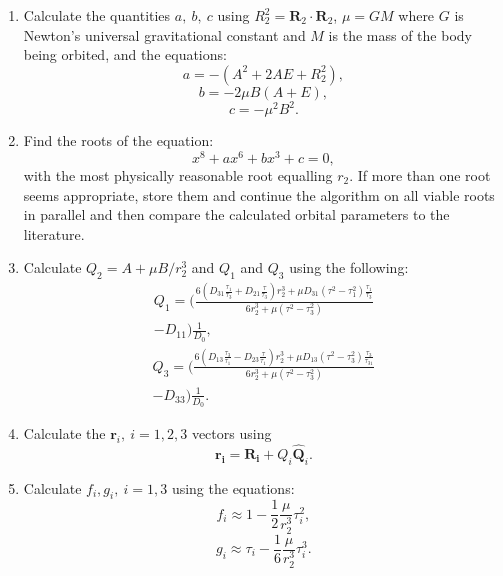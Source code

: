 \documentclass[10pt, twocolumn]{revtex4}    %
\begin{document}
\begin{enumerate}
 \item Calculate the quantities $a,\ b,\ c$ using $R_2^2 = \mathbf{R}_2 \cdot \mathbf{R}_2$, $\mu=GM$ where $G$ is Newton's universal gravitational constant and $M$ is the mass of the body being orbited, and the equations:
 \begin{equation}
 a = -(A^2 + 2AE + R_2^2),
 \end{equation}
 \begin{equation}
 b = -2\mu B(A+E),
 \end{equation}
 \begin{equation}
 c = -\mu^2B^2.
 \end{equation}
 \item Find the roots of the equation:
 \begin{equation}
 x^8 + ax^6 +bx^3 +c = 0,
 \end{equation}
 with the most physically reasonable root equalling $r_2$. If more than one root seems appropriate, store them and continue the algorithm on all viable roots in parallel and then compare the calculated orbital parameters to the literature.
 \item Calculate $Q_2 = A + \mu B/r_2^3$ and $Q_1$ and $Q_3$ using the following:
 \begin{multline} 
 Q_1 = \Bigg( \frac{6 \left(D_{31} \frac{\tau_1}{\tau_3} +D_{21}\frac{\tau}{\tau_3}\right) r^3_2 + \mu D_{31}(\tau^2 -\tau_1^2) \frac{\tau_1}{\tau_3} }{6r_2^3 + \mu(\tau^2-\tau^2_3)} \\
 -D_{11} \Bigg) \frac{1}{D_0} ,
 \end{multline}
 \begin{multline} 
 Q_3 = \Bigg( \frac{6 \left(D_{13} \frac{\tau_3}{\tau_1} -D_{23}\frac{\tau}{\tau_1}\right) r^3_2 + \mu D_{13}(\tau^2 - \tau_3^2) \frac{\tau_3}{\tau_31} }{6r_2^3 + \mu(\tau^2-\tau^2_3)} \\ 
 - D_{33} \Bigg)\frac{1}{D_0} .
 \end{multline}
 \item Calculate the $\mathbf{r}_i,\ i=1,2,3$ vectors using
 \begin{equation}
 \mathbf{r_i} = \mathbf{R_i} + Q_i \mathbf{\hat{Q}}_i.
 \end{equation}
 \item Calculate $f_i,g_i,\ i=1,3$ using the equations:
 \begin{equation}
 f_i \approx 1 - \frac{1}{2}\frac{\mu}{r_2^3}\tau_i^2 ,
 \end{equation}
 \begin{equation}
 g_i \approx \tau_i - \frac{1}{6}\frac{\mu}{r_2^3}\tau_i^3 .

\end{equation}
\end{enumerate}
\end{document}
